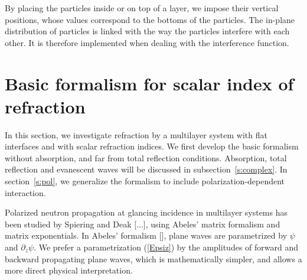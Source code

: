 By placing the particles
inside or on top of a layer, we impose their vertical positions, whose
values correspond to the bottoms of the particles. The in-plane distribution of particles is linked with the way the
particles interfere with each other. It is therefore implemented
when dealing with the interference function.


\renewcommand{\u}[1]{\underline{#1}}
\newcommand{\uu}[1]{\underline{\underline{#1}}}
\renewcommand{\t}{\uparrow}
\renewcommand{\d}{\downarrow}



\section{Basic formalism for scalar index of refraction}

In this section,
we investigate refraction by a multilayer system
with flat interfaces and with scalar refraction indices.
We first develop the basic formalism
without absorption, and far from total reflection conditions.
Absorption, total reflection and evanescent waves
will be discussed in subsection~\ref{s:complex}.
In section~\ref{s:pol},
we generalize the formalism to include
polarization-dependent interaction.

Polarized neutron propagation at glancing incidence
in multilayer systems has been studied by Spiering and Deak [...],
using Abeles' matrix formalism and matrix exponentials.
In Abeles' formalism [],
plane waves are parametrized by $\psi$ and $\partial_z\psi$.
We prefer a parametrization (\ref{Epsiz})
by the amplitudes of forward and backward propagating plane waves,
which is mathematically simpler,
and allows a more direct physical interpretation.

